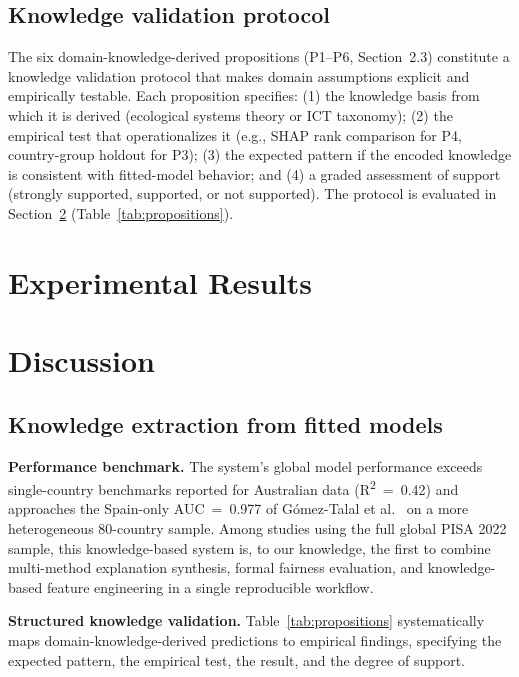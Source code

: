 \documentclass[review,12pt]{elsarticle}
\begin{document}
\subsection{Knowledge validation protocol}

The six domain-knowledge-derived propositions (P1--P6, Section~2.3) constitute a knowledge validation protocol that makes domain assumptions explicit and empirically testable. Each proposition specifies: (1) the knowledge basis from which it is derived (ecological systems theory or ICT taxonomy); (2) the empirical test that operationalizes it (e.g., SHAP rank comparison for P4, country-group holdout for P3); (3) the expected pattern if the encoded knowledge is consistent with fitted-model behavior; and (4) a graded assessment of support (strongly supported, supported, or not supported). The protocol is evaluated in Section~\ref{sec:discussion} (Table~\ref{tab:propositions}).

\section{Experimental Results}



\section{Discussion}
\label{sec:discussion}

\subsection{Knowledge extraction from fitted models}

\textbf{Performance benchmark.}
The system's global model performance exceeds single-country benchmarks reported for Australian data (R\textsuperscript{2}~=~0.42) \citep{Khine_2024} and approaches the Spain-only AUC~=~0.977 of G\'omez-Talal et al.\ \citep{Gomez_Talal_2025} on a more heterogeneous 80-country sample. Among studies using the full global PISA 2022 sample, this knowledge-based system is, to our knowledge, the first to combine multi-method explanation synthesis, formal fairness evaluation, and knowledge-based feature engineering in a single reproducible workflow.

\textbf{Structured knowledge validation.} Table~\ref{tab:propositions} systematically maps domain-knowledge-derived predictions to empirical findings, specifying the expected pattern, the empirical test, the result, and the degree of support.
\end{document}
